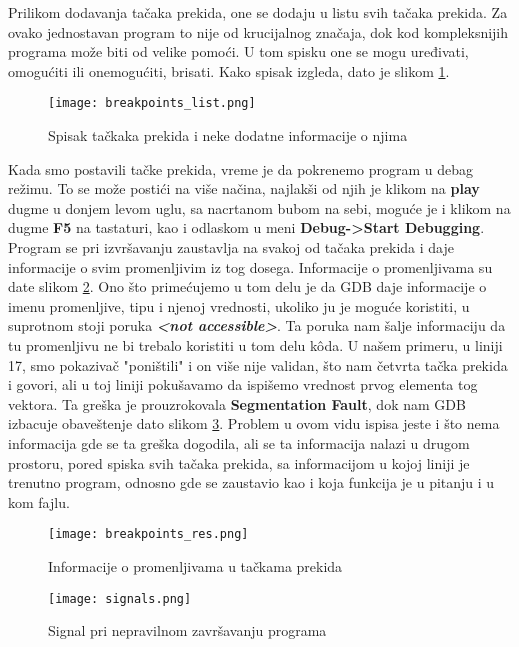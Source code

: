 \documentclass[a4paper]{article}
\begin{document}
Prilikom dodavanja tačaka prekida, one se dodaju u listu svih tačaka prekida. Za ovako jednostavan program to 
nije od krucijalnog značaja, dok kod kompleksnijih programa može biti od velike pomoći. U tom spisku one se mogu uređivati, 
omogućiti ili onemogućiti, brisati. Kako spisak izgleda, dato je slikom \ref{fig:points_list}.

\begin{figure}[h!]
\begin{center}
\texttt{[image: breakpoints\_list.png]}
\end{center}
\caption{Spisak tačkaka prekida i neke dodatne informacije o njima}
\label{fig:points_list}
\end{figure}

Kada smo postavili tačke prekida, vreme je da pokrenemo program u debag režimu. To se može postići na više načina,
najlakši od njih je klikom na \textbf{play} dugme u donjem levom uglu, sa nacrtanom bubom na sebi, moguće je i klikom na 
dugme \textbf{F5} na tastaturi, kao i odlaskom u meni \textbf{Debug->Start Debugging}\cite{QT}.
\\

Program se pri izvršavanju zaustavlja na svakoj od tačaka prekida i daje informacije o svim promenljivim iz tog dosega. 
Informacije o promenljivama su date slikom \ref{fig:points_res}. 
Ono što primećujemo u tom delu je da GDB daje informacije o imenu promenljive, tipu i njenoj vrednosti, 
ukoliko ju je moguće koristiti, u suprotnom stoji poruka \textbf{\textit{<not accessible>}}. Ta poruka nam šalje
informaciju da tu promenljivu ne bi trebalo koristiti u tom delu k\^{o}da. U našem primeru, u liniji 17, smo pokazivač "poništili" {} i 
on više nije validan, što nam četvrta tačka prekida i govori, ali u toj liniji pokušavamo da ispišemo vrednost prvog elementa
tog vektora. Ta greška je prouzrokovala \textbf{Segmentation Fault}, dok nam GDB izbacuje obaveštenje dato slikom \ref{fig:signals}.
Problem u ovom vidu ispisa jeste i što nema informacija gde se ta greška dogodila, ali se ta informacija nalazi u drugom prostoru, pored 
spiska svih tačaka prekida, sa informacijom u kojoj liniji je trenutno program, odnosno gde se zaustavio kao i koja funkcija je u pitanju i u kom fajlu.

\begin{figure}[h!]
\begin{center}
\texttt{[image: breakpoints\_res.png]}
\end{center}
\caption{Informacije o promenljivama u tačkama prekida}
\label{fig:points_res}
\end{figure}


\begin{figure}[h!]
\begin{center}
\texttt{[image: signals.png]}
\end{center}
\caption{Signal pri nepravilnom završavanju programa}
\label{fig:signals}
\end{figure}
\end{document}
